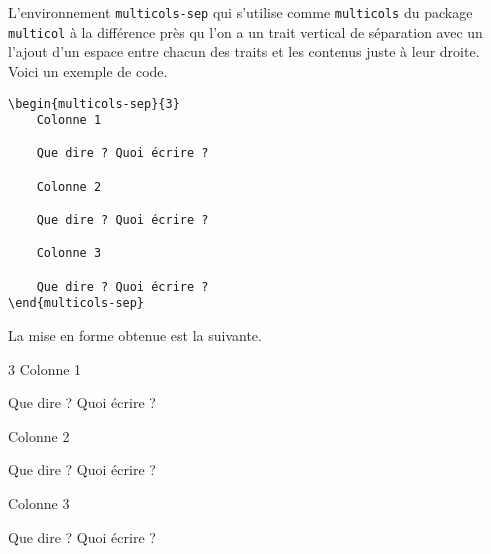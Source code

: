 L'environnement \verb+multicols-sep+ qui s'utilise comme \verb+multicols+ du package \verb+multicol+ à la différence près qu l'on a un trait vertical de séparation avec un l'ajout d'un espace entre chacun des traits et les contenus juste à leur droite.  
Voici un exemple de code.

\begin{frame-gene}
\small
\begin{verbatim}
\begin{multicols-sep}{3}
	Colonne 1
	
	Que dire ? Quoi écrire ?

	Colonne 2
	
	Que dire ? Quoi écrire ?

	Colonne 3

	Que dire ? Quoi écrire ?
\end{multicols-sep}
\end{verbatim}
\end{frame-gene}



\medskip

La mise en forme obtenue est la suivante.

\begin{frame-gene}
\small
\begin{multicols-sep}{3}
	Colonne 1
	
	Que dire ? Quoi écrire ?

	Colonne 2
	
	Que dire ? Quoi écrire ?

	Colonne 3

	Que dire ? Quoi écrire ?
\end{multicols-sep}
\end{frame-gene}